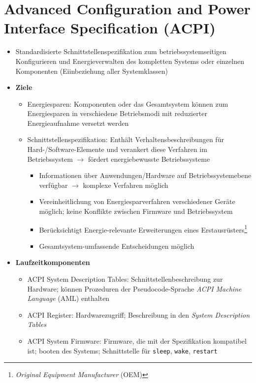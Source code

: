 \section{Advanced Configuration and Power Interface Specification (ACPI)}
\begin{itemize}
	\item Standardisierte Schnittstellenspezifikation zum betriebssystemseitigen Konfigurieren und Energieverwalten des kompletten Systems oder einzelnen Komponenten (Eiinbeziehung aller Systemklassen)
	\item \textbf{Ziele}
	\begin{itemize}
		\item Energiesparen: Komponenten oder das Gesamtsystem können zum Energiesparen in verschiedene Betriebsmodi mit reduzierter Energieaufnahme versetzt werden
		\item Schnittstellenspezifikation: Enthält Verhaltensbeschreibungen für Hard-/Software-Elemente und verankert diese Verfahren im Betriebssystem \(\rightarrow\) fördert energiebewusste Betriebssysteme
		\begin{itemize}
			\item Informationen über Anwendungen/Hardware auf Betriebssystemebene verfügbar \(\rightarrow\) komplexe Verfahren möglich
			\item Vereinheitlichung von Energiesparverfahren verschiedener Geräte möglich; keine Konflikte zwischen Firmware und Betriebssystem
			\item Berücksichtigt Energie-relevante Erweiterungen eines Erstausrüsters\footnote{\textit{Original Equipment Manufacturer} (OEM)}
			\item Gesamtsystem-umfassende Entscheidungen möglich
		\end{itemize}
	\end{itemize}
	\item \textbf{Laufzeitkomponenten}
	\begin{itemize}
		\item ACPI System Description Tables: Schnittstellenbeschreibung zur Hardware; können Prozeduren der Pseudocode-Sprache \textit{ACPI Machine Language} (AML) enthalten
		\item ACPI Register: Hardwarezugriff; Beschreibung in den \textit{System Description Tables}
		\item ACPI System Firmware: Firmware, die mit der Spezifikation kompatibel ist; booten des Systems; Schnittstelle für \texttt{sleep}, \texttt{wake}, \texttt{restart}
	\end{itemize}

\end{itemize}
